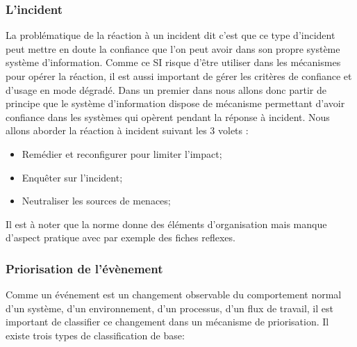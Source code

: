 
\subsubsection{L'incident}

La problématique de la réaction à un incident dit  c'est que ce type d'incident  peut mettre en doute la confiance que l'on peut avoir dans son propre système système d'information. Comme ce SI risque d'être utiliser dans les mécanismes pour opérer la réaction, il est aussi important de gérer les critères de confiance et d'usage en mode dégradé.
Dans un premier dans nous allons donc partir de principe que le système d'information dispose de mécanisme permettant d'avoir confiance dans les systèmes qui opèrent pendant la réponse à incident.
Nous allons aborder la réaction à incident suivant les 3 volets  :
\begin{itemize}
  \item Remédier et reconfigurer pour limiter l’impact;
  \item  Enquêter sur l’incident;
  \item Neutraliser les sources de menaces;
\end{itemize}


Il est à noter que la norme donne des éléments d'organisation mais manque d'aspect pratique avec par exemple des fiches reflexes.

\subsubsection{Priorisation de l'évènement}
 Comme un événement est un changement observable du comportement normal d'un système, d'un environnement, d'un processus, d'un flux de travail, il est important de classifier ce changement dans un mécanisme de priorisation.  Il existe trois types de classification de base:
 
